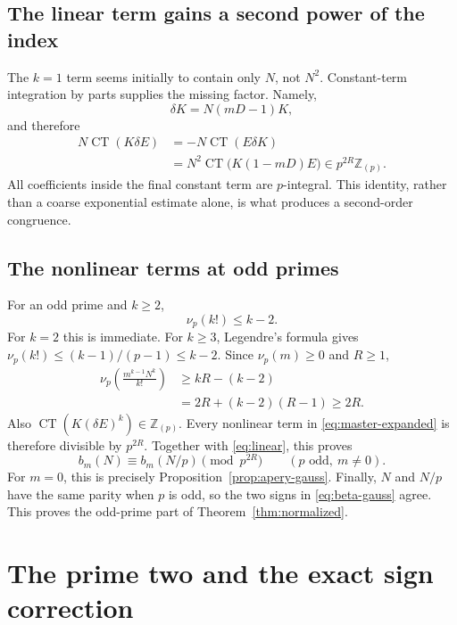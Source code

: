 \documentclass[11pt,letterpaper]{article}
\numberwithin{equation}{section}
\theoremstyle{definition}
\newcommand{\Z}{\mathbb Z}
\newcommand{\Zp}{\Z_{(p)}}
\newcommand{\dd}{\delta}
\newcommand{\CT}{\operatorname{CT}}
\begin{document}
\subsection{The linear term gains a second power of the index}

The $k=1$ term seems initially to contain only $N$, not $N^2$.
Constant-term integration by parts supplies the missing factor. Namely,
\begin{equation}\label{eq:delta-K}
\dd K=N(mD-1)K,
\end{equation}
and therefore
\begin{equation}\label{eq:linear}
\begin{aligned}
N\CT(K\dd E)
&=-N\CT(E\dd K)\\
&=N^2\CT\bigl(K(1-mD)E\bigr)
\in p^{2R}\Zp.
\end{aligned}
\end{equation}
All coefficients inside the final constant term are $p$-integral.
This identity, rather than a coarse exponential estimate alone, is what
produces a second-order congruence.

\subsection{The nonlinear terms at odd primes}

For an odd prime and $k\geq2$,
\begin{equation}\label{eq:factorial-odd}
\nu_p(k!)\leq k-2.
\end{equation}
For $k=2$ this is immediate. For $k\geq3$, Legendre's formula gives
$\nu_p(k!)\leq(k-1)/(p-1)\leq k-2$.
Since $\nu_p(m)\geq0$ and $R\geq1$,
\[
\begin{aligned}
\nu_p\left(\frac{m^{k-1}N^k}{k!}\right)
&\geq kR-(k-2)\\
&=2R+(k-2)(R-1)\geq2R.
\end{aligned}
\]
Also $\CT(K(\dd E)^k)\in\Zp$. Every nonlinear term in
\eqref{eq:master-expanded} is therefore divisible by $p^{2R}$.
Together with \eqref{eq:linear}, this proves
\begin{equation}\label{eq:b-odd}
b_m(N)\equiv b_m(N/p)\pmod{p^{2R}}
\qquad(p\text{ odd},\ m\neq0).
\end{equation}
For $m=0$, this is precisely Proposition~\ref{prop:apery-gauss}.
Finally, $N$ and $N/p$ have the same parity when $p$ is odd, so the two
signs in \eqref{eq:beta-gauss} agree. This proves the odd-prime part of
Theorem~\ref{thm:normalized}.

\section{The prime two and the exact sign correction}\label{sec:two}
\end{document}
